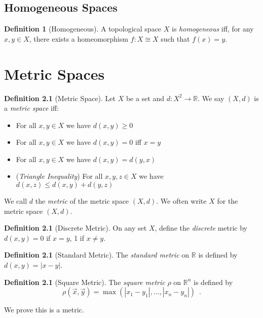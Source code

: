 \documentclass{book}
\theoremstyle{definition}
\newtheorem{df}[ax]{Definition}
\begin{document}
\section{Homogeneous Spaces}

\begin{df}[Homogeneous]
A topological space $X$ is \emph{homogeneous} iff, for any $x,y \in X$, there exists a homeomorphism $f : X \cong X$ such that $f(x) = y$.
\end{df}

\chapter{Metric Spaces}

\begin{df}[Metric Space]
Let $X$ be a set and $d : X^2 \rightarrow \mathbb{R}$. We say $(X,d)$ is a \emph{metric space} iff:
\begin{itemize}
\item For all $x,y \in X$ we have $d(x,y) \geq 0$
\item For all $x,y \in X$ we have $d(x,y) = 0$ iff $x = y$
\item For all $x,y \in X$ we have $d(x,y) = d(y,x)$
\item (\emph{Triangle Inequality}) For all $x,y,z \in X$ we have $d(x,z) \leq d(x,y) + d(y,z)$
\end{itemize}
We call $d$ the \emph{metric} of the metric space $(X,d)$. We often write $X$ for the metric space $(X,d)$.
\end{df}

\begin{df}[Discrete Metric]
On any set $X$, define the \emph{discrete} metric by $d(x,y) = 0$ if $x = y$, 1 if $x \neq y$.
\end{df}

\begin{df}[Standard Metric]
The \emph{standard metric} on $\mathbb{R}$ is defined by $d(x,y) = |x-y|$.
\end{df}

\begin{df}[Square Metric]
The \emph{square metric} $\rho$ on $\mathbb{R}^n$ is defined by
\[ \rho(\vec{x}, \vec{y}) = \max(|x_1 - y_1|, \ldots, |x_n - y_n|) \enspace . \]

We prove this is a metric.
\end{df}
\end{document}
